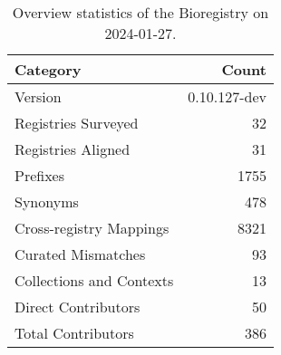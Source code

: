 \begin{table}
\caption{Overview statistics of the Bioregistry on 2024-01-27.}
\label{tab:bioregistry-summary}
\begin{tabular}{lr}
\toprule
Category & Count \\
\midrule
Version & 0.10.127-dev \\
Registries Surveyed & 32 \\
Registries Aligned & 31 \\
Prefixes & 1755 \\
Synonyms & 478 \\
Cross-registry Mappings & 8321 \\
Curated Mismatches & 93 \\
Collections and Contexts & 13 \\
Direct Contributors & 50 \\
Total Contributors & 386 \\
\bottomrule
\end{tabular}
\end{table}
